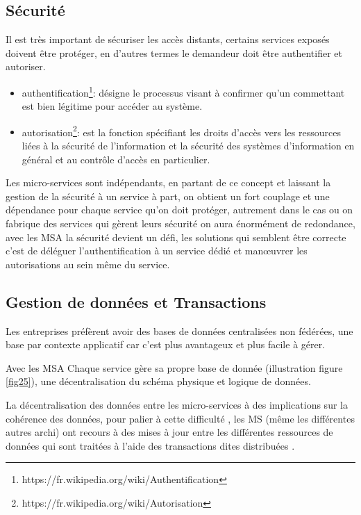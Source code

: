 \documentclass[12pt, a4paper, openany]{report}
\begin{document}
  \subsection{Sécurité}
  Il est très important de sécuriser les accès distants, certains services exposés doivent être protéger, en d’autres termes le demandeur doit être authentifier et autoriser.
  \begin{itemize}
      \item authentification\footnote{https://fr.wikipedia.org/wiki/Authentification}: désigne le processus visant à confirmer qu'un commettant est bien légitime pour accéder au système.
      \item autorisation\footnote{https://fr.wikipedia.org/wiki/Autorisation}: est la fonction spécifiant les droits d'accès vers les ressources liées à la sécurité de l'information et la sécurité des systèmes d'information en général et au contrôle d'accès en particulier.
  \end{itemize}
  Les micro-services sont indépendants, en partant de ce concept et laissant la gestion de la sécurité à un service à part, on obtient un fort couplage et une dépendance pour chaque service qu’on doit protéger, autrement dans le cas ou on fabrique des services qui gèrent leurs sécurité on aura énormément de redondance, avec les MSA la sécurité devient un défi, les solutions qui semblent être correcte c’est de déléguer l’authentification à un service dédié et manœuvrer les autorisations au sein même du service.
  
  \subsection{Gestion de données et Transactions}
  Les entreprises préfèrent avoir des bases de données centralisées non fédérées, une base par contexte applicatif car c’est plus avantageux et plus facile à gérer.

  Avec les MSA Chaque service gère sa propre base de donnée (illustration figure \ref{fig25}), une décentralisation du schéma physique et logique de données.

  La décentralisation des données entre les micro-services à des implications sur la cohérence des données,  pour palier à cette difficulté , les MS (même les différentes autres archi) ont recours à des mises à jour entre les différentes ressources de données  qui sont traitées à l’aide des transactions dites distribuées \cite{refbibFowler}.  \\
  
\end{document}
